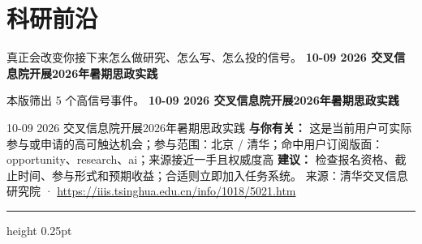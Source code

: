 \documentclass[10.5pt]{ctexart}
\begin{document}
\section*{科研前沿}
{\color{ormuted} 真正会改变你接下来怎么做研究、怎么写、怎么投的信号。}
\vspace{2mm}
{\LARGE\bfseries 10-09 2026 交叉信息院开展2026年暑期思政实践}\par
\vspace{1mm}
{\color{ormuted} 本版筛出 5 个高信号事件。}
\vspace{3mm}
{\Large\bfseries 10-09 2026 交叉信息院开展2026年暑期思政实践}\par
10-09 2026 交叉信息院开展2026年暑期思政实践
\textbf{与你有关：} 这是当前用户可实际参与或申请的高可触达机会；参与范围：北京 / 清华；命中用户订阅版面：opportunity、research、ai；来源接近一手且权威度高
\textbf{建议：} 检查报名资格、截止时间、参与形式和预期收益；合适则立即加入任务系统。
{\footnotesize\color{ormuted} 来源：清华交叉信息研究院 · \url{https://iiis.tsinghua.edu.cn/info/1018/5021.htm}}
\vspace{4mm}
\hrule height 0.25pt
\vspace{3mm}
\end{document}

